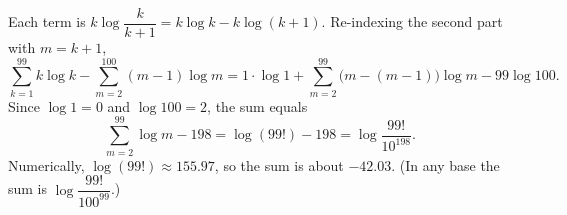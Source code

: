 Each term is $k\log\dfrac{k}{k+1}=k\log k-k\log(k+1)$. Re-indexing the second part with $m=k+1$,
\[\sum_{k=1}^{99}k\log k-\sum_{m=2}^{100}(m-1)\log m=1\cdot\log1+\sum_{m=2}^{99}\bigl(m-(m-1)\bigr)\log m-99\log100.\]
Since $\log1=0$ and $\log100=2$, the sum equals
\[\sum_{m=2}^{99}\log m-198=\boxed{\log(99!)-198}=\log\dfrac{99!}{10^{198}}.\]
Numerically, $\log(99!)\approx155.97$, so the sum is about $-42.03$. (In any base the sum is $\log\dfrac{99!}{100^{99}}$.)
